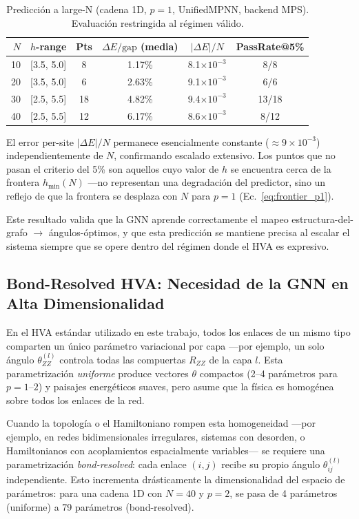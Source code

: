 \documentclass[11pt,a4paper,spanish]{book}
\begin{document}
\begin{table}[h]
\centering
\caption{Predicción a large-N (cadena 1D, $p = 1$, UnifiedMPNN, backend MPS). Evaluación restringida al régimen válido.}
\label{tab:large_n_chain}
\begin{tabular}{rccccc}
\toprule
\textbf{$N$} & \textbf{$h$-range} & \textbf{Pts} & \textbf{$\Delta E/\text{gap}$ (media)} & \textbf{$|\Delta E|/N$} & \textbf{PassRate@5\%} \\
\midrule
10 & [3.5, 5.0] & 8 & 1.17\% & 8.1$\times 10^{-3}$ & 8/8 \\
20 & [3.5, 5.0] & 6 & 2.63\% & 9.1$\times 10^{-3}$ & 6/6 \\
30 & [2.5, 5.5] & 18 & 4.82\% & 9.4$\times 10^{-3}$ & 13/18 \\
40 & [2.5, 5.5] & 12 & 6.17\% & 8.6$\times 10^{-3}$ & 8/12 \\
\bottomrule
\end{tabular}
\end{table}

El error per-site $|\Delta E|/N$ permanece esencialmente constante ($\approx 9 \times 10^{-3}$) independientemente de $N$, confirmando escalado extensivo. Los puntos que no pasan el criterio del 5\% son aquellos cuyo valor de $h$ se encuentra cerca de la frontera $h_{\min}(N)$ ---no representan una degradación del predictor, sino un reflejo de que la frontera se desplaza con $N$ para $p = 1$ (Ec.~\ref{eq:frontier_p1}).

Este resultado valida que la GNN aprende correctamente el mapeo estructura-del-grafo $\to$ ángulos-óptimos, y que esta predicción se mantiene precisa al escalar el sistema siempre que se opere dentro del régimen donde el HVA es expresivo.

\subsection{Bond-Resolved HVA: Necesidad de la GNN en Alta Dimensionalidad}
\label{subsec:bond_resolved}

En el HVA estándar utilizado en este trabajo, todos los enlaces de un mismo tipo comparten un único parámetro variacional por capa ---por ejemplo, un solo ángulo $\theta_{ZZ}^{(l)}$ controla todas las compuertas $R_{ZZ}$ de la capa $l$. Esta parametrización \emph{uniforme} produce vectores $\theta$ compactos (2--4 parámetros para $p = 1$--$2$) y paisajes energéticos suaves, pero asume que la física es homogénea sobre todos los enlaces de la red.

Cuando la topología o el Hamiltoniano rompen esta homogeneidad ---por ejemplo, en redes bidimensionales irregulares, sistemas con desorden, o Hamiltonianos con acoplamientos espacialmente variables--- se requiere una parametrización \emph{bond-resolved}: cada enlace $(i,j)$ recibe su propio ángulo $\theta_{ij}^{(l)}$ independiente. Esto incrementa drásticamente la dimensionalidad del espacio de parámetros: para una cadena 1D con $N = 40$ y $p = 2$, se pasa de 4 parámetros (uniforme) a 79 parámetros (bond-resolved).
\end{document}

